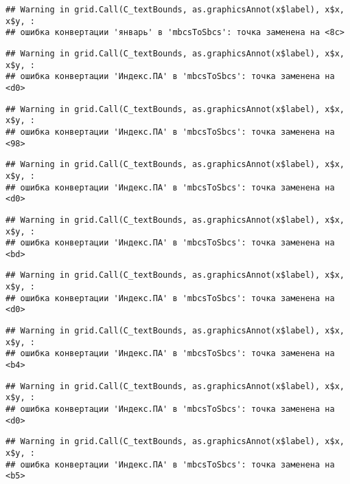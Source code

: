 \documentclass[
]{article}
\begin{document}
\begin{verbatim}
## Warning in grid.Call(C_textBounds, as.graphicsAnnot(x$label), x$x, x$y, :
## ошибка конвертации 'январь' в 'mbcsToSbcs': точка заменена на <8c>
\end{verbatim}

\begin{verbatim}
## Warning in grid.Call(C_textBounds, as.graphicsAnnot(x$label), x$x, x$y, :
## ошибка конвертации 'Индекс.ПА' в 'mbcsToSbcs': точка заменена на <d0>
\end{verbatim}

\begin{verbatim}
## Warning in grid.Call(C_textBounds, as.graphicsAnnot(x$label), x$x, x$y, :
## ошибка конвертации 'Индекс.ПА' в 'mbcsToSbcs': точка заменена на <98>
\end{verbatim}

\begin{verbatim}
## Warning in grid.Call(C_textBounds, as.graphicsAnnot(x$label), x$x, x$y, :
## ошибка конвертации 'Индекс.ПА' в 'mbcsToSbcs': точка заменена на <d0>
\end{verbatim}

\begin{verbatim}
## Warning in grid.Call(C_textBounds, as.graphicsAnnot(x$label), x$x, x$y, :
## ошибка конвертации 'Индекс.ПА' в 'mbcsToSbcs': точка заменена на <bd>
\end{verbatim}

\begin{verbatim}
## Warning in grid.Call(C_textBounds, as.graphicsAnnot(x$label), x$x, x$y, :
## ошибка конвертации 'Индекс.ПА' в 'mbcsToSbcs': точка заменена на <d0>
\end{verbatim}

\begin{verbatim}
## Warning in grid.Call(C_textBounds, as.graphicsAnnot(x$label), x$x, x$y, :
## ошибка конвертации 'Индекс.ПА' в 'mbcsToSbcs': точка заменена на <b4>
\end{verbatim}

\begin{verbatim}
## Warning in grid.Call(C_textBounds, as.graphicsAnnot(x$label), x$x, x$y, :
## ошибка конвертации 'Индекс.ПА' в 'mbcsToSbcs': точка заменена на <d0>
\end{verbatim}

\begin{verbatim}
## Warning in grid.Call(C_textBounds, as.graphicsAnnot(x$label), x$x, x$y, :
## ошибка конвертации 'Индекс.ПА' в 'mbcsToSbcs': точка заменена на <b5>
\end{verbatim}
\end{document}
